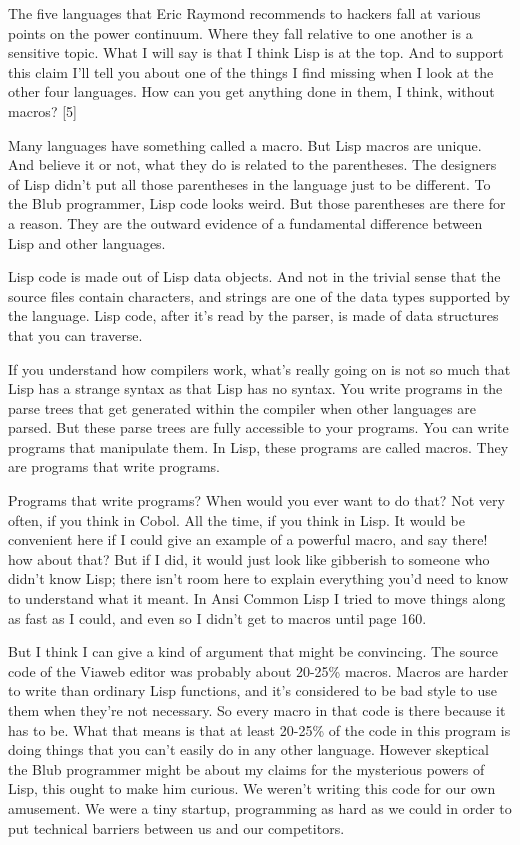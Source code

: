 \documentclass[10pt,twoside,openright]{memoir}
\begin{document}
The five languages that Eric Raymond recommends to hackers fall at various points on the power continuum. Where they fall relative to one another is a sensitive topic. What I will say is that I think Lisp is at the top. And to support this claim I'll tell you about one of the things I find missing when I look at the other four languages. How can you get anything done in them, I think, without macros? [5]

Many languages have something called a macro. But Lisp macros are unique. And believe it or not, what they do is related to the parentheses. The designers of Lisp didn't put all those parentheses in the language just to be different. To the Blub programmer, Lisp code looks weird. But those parentheses are there for a reason. They are the outward evidence of a fundamental difference between Lisp and other languages.

Lisp code is made out of Lisp data objects. And not in the trivial sense that the source files contain characters, and strings are one of the data types supported by the language. Lisp code, after it's read by the parser, is made of data structures that you can traverse.

If you understand how compilers work, what's really going on is not so much that Lisp has a strange syntax as that Lisp has no syntax. You write programs in the parse trees that get generated within the compiler when other languages are parsed. But these parse trees are fully accessible to your programs. You can write programs that manipulate them. In Lisp, these programs are called macros. They are programs that write programs.

Programs that write programs? When would you ever want to do that? Not very often, if you think in Cobol. All the time, if you think in Lisp. It would be convenient here if I could give an example of a powerful macro, and say there! how about that? But if I did, it would just look like gibberish to someone who didn't know Lisp; there isn't room here to explain everything you'd need to know to understand what it meant. In Ansi Common Lisp I tried to move things along as fast as I could, and even so I didn't get to macros until page 160.

But I think I can give a kind of argument that might be convincing. The source code of the Viaweb editor was probably about 20-25\% macros. Macros are harder to write than ordinary Lisp functions, and it's considered to be bad style to use them when they're not necessary. So every macro in that code is there because it has to be. What that means is that at least 20-25\% of the code in this program is doing things that you can't easily do in any other language. However skeptical the Blub programmer might be about my claims for the mysterious powers of Lisp, this ought to make him curious. We weren't writing this code for our own amusement. We were a tiny startup, programming as hard as we could in order to put technical barriers between us and our competitors.
\end{document}

